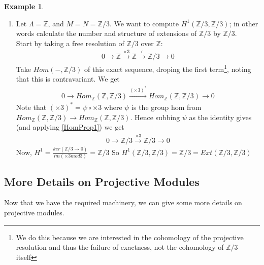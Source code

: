 \documentclass[12pt]{book}
\theoremstyle{definition}
\newtheorem{example}[theorem]{Example}
\begin{document}
\begin{example}
    \begin{enumerate}
        \item Let $\Lambda = \mathbb{Z}$, and $M = N = \mathbb{Z}/3$. We want to compute $H^1(\mathbb{Z}/3, \mathbb{Z}/3)$; in other words calculate the number and structure of extensions of $\mathbb{Z}/3$ by $\mathbb{Z}/3$.\\
        Start by taking a free resolution of $\mathbb{Z}/3$ over $\mathbb{Z}$: 
        \begin{align*}
            0 \rightarrow \mathbb{Z} \xrightarrow{\times 3} \mathbb{Z} \xrightarrow{\epsilon} \mathbb{Z/3} \rightarrow 0
        \end{align*}
        Take $Hom(-, \mathbb{Z}/3)$ of this exact sequence, droping the first term\footnote{We do this because we are interested in the cohomology of the projective resolution and thus the failure of exactness, not the cohomology of $\mathbb{Z}/3$ itself}, noting that this is contravariant. We get
        \begin{align*}
            0 \rightarrow Hom_\mathbb{Z}(\mathbb{Z}, \mathbb{Z}/3) \xrightarrow{(\times 3)^*} Hom_\mathbb{Z}(\mathbb{Z}, \mathbb{Z}/3) \rightarrow{0}
        \end{align*}
        Note that $(\times 3)^* = \psi \circ \times 3$ where $\psi$ is the group hom from $Hom_\mathbb{Z}(\mathbb{Z}, \mathbb{Z}/3) \to Hom_\mathbb{Z}(\mathbb{Z}, \mathbb{Z}/3)$. Hence subbing $\psi$ as the identity gives (and applying \ref{HomProp1}) we get 
        \begin{align*}
            0 \rightarrow \mathbb{Z}/3 \xrightarrow{\times 3} \mathbb{Z}/3 \rightarrow 0
        \end{align*}
        Now, $H^1 = \frac{ker(\mathbb{Z}/3 \to 0)}{im(\times 3 mod 3)} = \mathbb{Z}/3$
        So $H^1(\mathbb{Z}/3, \mathbb{Z}/3) = \mathbb{Z}/3 = Ext(\mathbb{Z}/3, \mathbb{Z}/3)$
    \end{enumerate}
\end{example}

\subsection{More Details on Projective Modules}
Now that we have the required machinery, we can give some more details on projective modules. 
\end{document}
